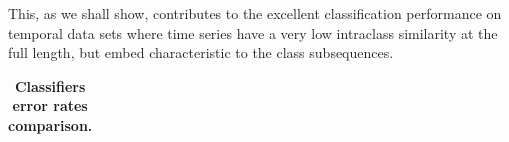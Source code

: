 \documentclass[conference]{IEEEtran}
\newcommand{\myfigureshrinkerless}{\vspace{-0.05cm}}
\begin{document}
This, as we shall show, contributes to the excellent classification performance on temporal 
data sets where time series have a very low intraclass similarity at the full length, but 
embed characteristic to the class subsequences. 

\enlargethispage{0.5cm} 
\begin{footnotesize}
\begin{table}[t]
\myfigureshrinkerless
\caption{\bf Classifiers error rates comparison.}
 \label{perf_table}
\centering
\begin{tabularx}{\linewidth}{@{} l *6X @{}}\toprule[1pt]


\end{tabularx}
\end{table}
\end{footnotesize}
\end{document}
